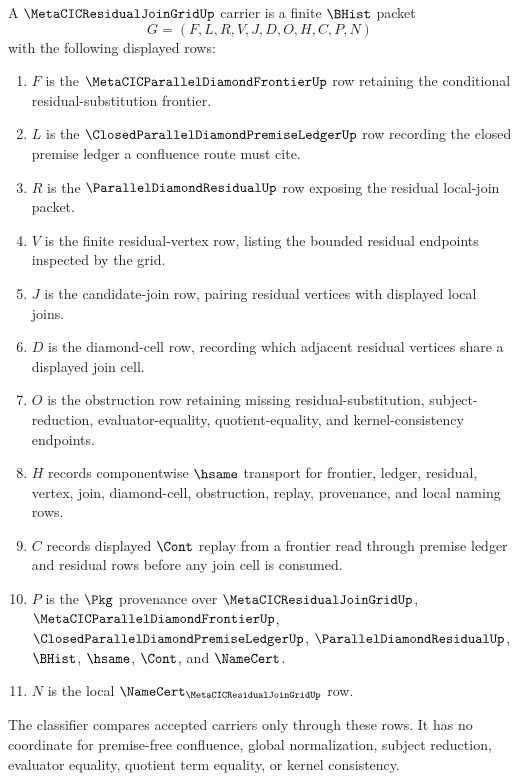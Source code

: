\begin{definition}
\label{def:metacic-residual-join-grid-carrier}
A $\MetaCICResidualJoinGridUp$ carrier is a finite $\BHist$ packet
$$
G=(F,L,R,V,J,D,O,H,C,P,N)
$$
with the following displayed rows:
\begin{enumerate}
\item $F$ is the $\MetaCICParallelDiamondFrontierUp$ row retaining the conditional residual-substitution frontier.
\item $L$ is the $\ClosedParallelDiamondPremiseLedgerUp$ row recording the closed premise ledger a confluence route must cite.
\item $R$ is the $\ParallelDiamondResidualUp$ row exposing the residual local-join packet.
\item $V$ is the finite residual-vertex row, listing the bounded residual endpoints inspected by the grid.
\item $J$ is the candidate-join row, pairing residual vertices with displayed local joins.
\item $D$ is the diamond-cell row, recording which adjacent residual vertices share a displayed join cell.
\item $O$ is the obstruction row retaining missing residual-substitution, subject-reduction, evaluator-equality, quotient-equality, and kernel-consistency endpoints.
\item $H$ records componentwise $\hsame$ transport for frontier, ledger, residual, vertex, join, diamond-cell, obstruction, replay, provenance, and local naming rows.
\item $C$ records displayed $\Cont$ replay from a frontier read through premise ledger and residual rows before any join cell is consumed.
\item $P$ is the $\Pkg$ provenance over $\MetaCICResidualJoinGridUp$, $\MetaCICParallelDiamondFrontierUp$, $\ClosedParallelDiamondPremiseLedgerUp$, $\ParallelDiamondResidualUp$, $\BHist$, $\hsame$, $\Cont$, and $\NameCert$.
\item $N$ is the local $\NameCert_{\MetaCICResidualJoinGridUp}$ row.
\end{enumerate}
The classifier compares accepted carriers only through these rows. It has no coordinate for premise-free confluence, global normalization, subject reduction, evaluator equality, quotient term equality, or kernel consistency.
\end{definition}

